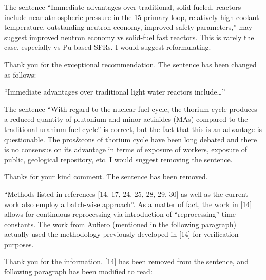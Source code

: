 \documentclass[answers,11pt]{exam}
\begin{document}
\begin{questions}
        
        \question The sentence ``Immediate advantages over traditional, solid-fueled, 
        reactors include near-atmospheric pressure in the 15 primary loop, 
        relatively high coolant temperature, outstanding neutron economy, 
        improved safety parameters,'' may suggest improved neutron economy vs 
        solid-fuel fast reactors. This is rarely the case, especially vs 
        Pu-based SFRs. I would suggest reformulating.
        \begin{solution}
                Thank you for the exceptional recommendation. The sentence has been 
                changed as follows:
                
                ``Immediate advantages over traditional light water reactors 
                include\dots''
        \end{solution}


        \question The sentence ``With regard to the nuclear fuel cycle, the 
        thorium cycle produces a reduced quantity of plutonium and minor 
        actinides (MAs) compared to the traditional uranium fuel cycle'' is 
        correct, but the fact that this is an advantage is questionable. The 
        pros\&cons of thorium cycle have been long debated and there is no 
        consensus on its advantage in terms of exposure of workers, exposure of 
        public, geological repository, etc. I would suggest removing the 
        sentence.
        \begin{solution}
                Thanks for your kind comment. The sentence has been removed.
        \end{solution}



        \question ``Methods listed in references [14, 17, 24, 25, 28, 29, 30] 
        as well as the current work also employ a batch-wise approach''. As a 
        matter of fact, the work in [14]  allows for continuous reprocessing 
        via introduction of ``reprocessing'' time constants. The work from  
        Aufiero (mentioned in the following paragraph) actually used the 
        methodology previously developed in [14]  for verification purposes.
        \begin{solution}
                Thank you for the information. [14] has been removed from the 
                sentence, and following paragraph has been modified to read:
                

\end{solution}
\end{questions}
\end{document}
